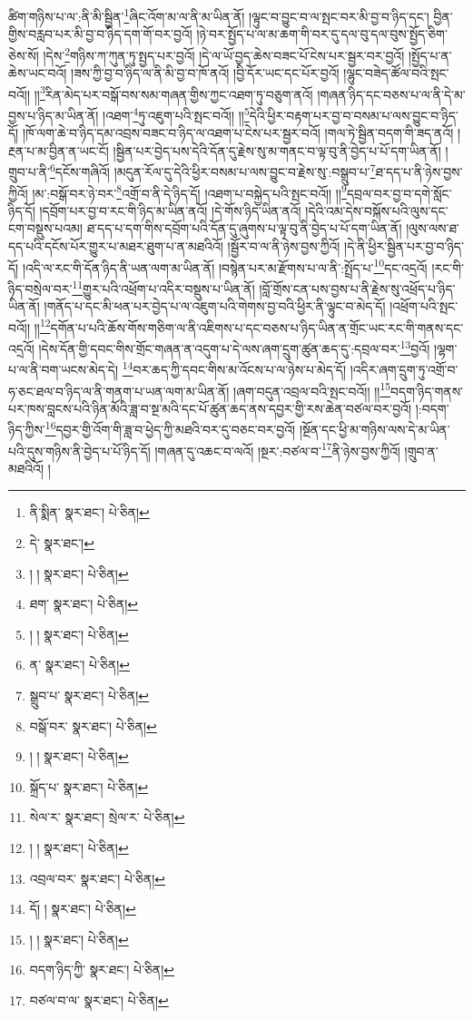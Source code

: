 ཚིག་གཉིས་པ་ལ་:ནི་མི་སྦྱིན་\footnote{ནི་སྨིན་  སྣར་ཐང་།  པེ་ཅིན། }ཞིང་འོག་མ་ལ་ནི་མ་ཡིན་ནོ། །ལྟུང་བ་བྱུང་བ་ལ་སྤང་བར་མི་བྱ་བ་ཉིད་དང་། བྱིན་གྱིས་བརླབ་པར་མི་བྱ་བ་ཉིད་དག་གོ་བར་བྱའོ། །ཉེ་བར་སྤྱོད་པ་ལ་མ་ཆག་གི་བར་དུ་དལ་བུ་དལ་བུས་སྤྱོད་ཅིག་ཅེས་སོ། །དེས་\footnote{དེ་  སྣར་ཐང་། }གཉིས་ཀ་ཀུན་ཏུ་སྤྱད་པར་བྱའོ། །དེ་ལ་ཡོ་བྱད་ཆེས་བཟང་པོ་ངེས་པར་སྦྱར་བར་བྱའོ། །སྤྱོད་པ་ན་ཆེས་ཡང་བའོ། །ཟས་ཀྱི་བྱ་བ་ཉིད་ལ་ནི་མི་བྱ་བ་ཁོ་ནའོ། །བྱི་དོར་ཡང་དང་པོར་བྱའོ། །ལྷུང་བཟེད་ཚོལ་བའི་སྤང་བའོ།། །།\footnote{། །  སྣར་ཐང་།  པེ་ཅིན། }རིན་མེད་པར་བསྒོ་བས་སམ་གཞན་གྱིས་ཀྱང་འཐག་ཏུ་བཅུག་ནའོ། །གཞན་ཉིད་དང་བཅས་པ་ལ་ནི་དེ་མ་བྱས་པ་ཉིད་མ་ཡིན་ནོ། །འཐག་\footnote{ཐག་  སྣར་ཐང་།  པེ་ཅིན། }ཏུ་འཇུག་པའི་སྤང་བའོ།། །།\footnote{། །  སྣར་ཐང་།  པེ་ཅིན། }དེའི་ཕྱིར་བརྟག་པར་བྱ་བ་བསམ་པ་ལས་བྱུང་བ་ཉིད་དོ། །ཁོ་ལག་ཆེ་བ་ཉིད་དམ་འབྲས་བཟང་བ་ཉིད་ལ་འཐག་པ་ངེས་པར་སྦྱར་བའོ། །གལ་ཏེ་སྦྱིན་བདག་གི་ཟད་ནའོ། །རྔན་པ་མ་བྱིན་ན་ཡང་ངོ། །སྦྱིན་པར་བྱེད་པས་དེའི་དོན་དུ་རྗེས་སུ་མ་གནང་བ་ལྟ་བུ་ནི་བྱེད་པ་པོ་དག་ཡིན་ནོ། །གྲུབ་པ་ནི་\footnote{ན་  སྣར་ཐང་།  པེ་ཅིན། }དངོས་གཞིའོ། །མདུན་རོལ་དུ་དེའི་ཕྱིར་བསམ་པ་ལས་བྱུང་བ་རྗེས་སུ་:བསྒྲུབ་པ་\footnote{སྒྲུབ་པ་  སྣར་ཐང་།  པེ་ཅིན། }ཐ་དད་པ་ནི་ཉེས་བྱས་ཀྱིའོ། །མ་:བསྒོ་བར་ཉེ་བར་\footnote{བསྒོ་བར་  སྣར་ཐང་།  པེ་ཅིན། }འགྲོ་བ་ནི་དེ་ཉིད་དོ། །འཐག་པ་བསྐྱེད་པའི་སྤང་བའོ།། །།\footnote{། །  སྣར་ཐང་།  པེ་ཅིན། }དབྲལ་བར་བྱ་བ་དགེ་སློང་ཉིད་དོ། །དབྲོག་པར་བྱ་བ་རང་གི་ཉིད་མ་ཡིན་ནའོ། །དེ་གོས་ཉིད་ཡིན་ནའོ། །དེའི་འམ་དེས་བསྐོས་པའི་ལུས་དང་ངག་བསྡུས་པའམ། ཐ་དད་པ་དག་གིས་དབྲོག་པའི་དོན་དུ་ཞུགས་པ་ལྟ་བུ་ནི་བྱེད་པ་པོ་དག་ཡིན་ནོ། །ལུས་ལས་ཐ་དད་པའི་དངོས་པོར་གྱུར་པ་མཐར་ཐུག་པ་ན་མཐའིའོ། །སྦྱོར་བ་ལ་ནི་ཉེས་བྱས་ཀྱིའོ། །དེ་ནི་ཕྱིར་སྦྱིན་པར་བྱ་བ་ཉིད་དོ། །འདི་ལ་རང་གི་དོན་ཉིད་ནི་ཡན་ལག་མ་ཡིན་ནོ། །བསྙེན་པར་མ་རྫོགས་པ་ལ་ནི་:སྤྲོད་པ་\footnote{སྐྲོད་པ་  སྣར་ཐང་།  པེ་ཅིན། }དང་འདྲའོ། །རང་གི་ཉིད་བསྲེལ་བར་\footnote{སེལ་ར་  སྣར་ཐང་། སྲེལ་ར་  པེ་ཅིན། }གྱུར་པའི་འཕྲོག་པ་འདིར་བསྡུས་པ་ཡིན་ནོ། །བློ་གྲོས་ངན་པས་བྱས་པ་ནི་རྗེས་སུ་འཕྲོད་པ་ཉིད་ཡིན་ནོ། །གནོད་པ་དང་མི་ཕན་པར་བྱེད་པ་ལ་འཇུག་པའི་གེགས་བྱ་བའི་ཕྱིར་ནི་ལྟུང་བ་མེད་དོ། །འཕྲོག་པའི་སྤང་བའོ།། །།\footnote{། །  སྣར་ཐང་།  པེ་ཅིན། }དགོན་པ་པའི་ཆོས་གོས་གཅིག་ལ་ནི་འཇིགས་པ་དང་བཅས་པ་ཉིད་ཡིན་ན་གྲོང་ཡང་རང་གི་གནས་དང་འདྲའོ། །དེས་དོན་གྱི་དབང་གིས་གྲོང་གཞན་ན་འདུག་པ་དེ་ལས་ཞག་དྲུག་ཚུན་ཆད་དུ་:དབྲལ་བར་\footnote{འབྲལ་བར་  སྣར་ཐང་།  པེ་ཅིན། }བྱའོ། །ལྷག་པ་ལ་ནི་བག་ཡངས་མེད་དེ། \footnote{དོ། །   སྣར་ཐང་།  པེ་ཅིན། }བར་ཆད་ཀྱི་དབང་གིས་མ་འོངས་པ་ལ་ཉེས་པ་མེད་དོ། །འདིར་ཞག་དྲུག་ཏུ་འགྲོ་བ་ཧ་ཅང་ཐལ་བ་ཉིད་ལ་ནི་གནག་པ་ཡན་ལག་མ་ཡིན་ནོ། །ཞག་བདུན་འབྲལ་བའི་སྤང་བའོ།། །།\footnote{། །  སྣར་ཐང་།  པེ་ཅིན། }བདག་ཉིད་གནས་པར་ཁས་བླངས་པའི་ཉིན་མོའི་ཟླ་བ་སྔ་མའི་དང་པོ་ཚུན་ཆད་ནས་དབྱར་གྱི་རས་ཆེན་བཙལ་བར་བྱའོ། །:བདག་ཉིད་ཀྱིས་\footnote{བདག་ཉིད་ཀྱི་  སྣར་ཐང་།  པེ་ཅིན། }དབྱར་གྱི་འོག་གི་ཟླ་བ་ཕྱེད་ཀྱི་མཐའི་བར་དུ་བཅང་བར་བྱའོ། །སྔོན་དང་ཕྱི་མ་གཉིས་ལས་དེ་མ་ཡིན་པའི་དུས་གཉིས་ནི་བྱེད་པ་པོ་ཉིད་དོ། །གཞན་དུ་འཆང་བ་ལའོ། །སྔར་:བཙལ་བ་\footnote{བཙལ་བ་ལ་  སྣར་ཐང་།  པེ་ཅིན། }ནི་ཉེས་བྱས་ཀྱིའོ། །གྲུབ་ན་མཐའིའོ། །
